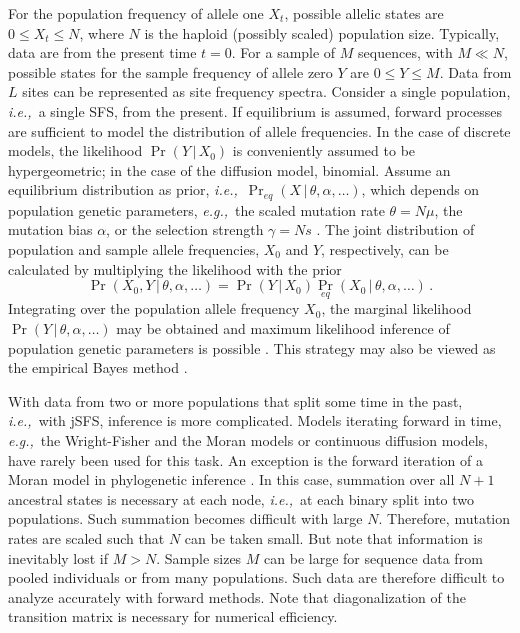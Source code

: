 \documentclass[preprint]{elsarticle}
\newcommand\given{{\,|\,}}
\newcommand\eg{{\it e.g.,}}
\newcommand\ie{{\it i.e.,}}
\begin{document}
For the population frequency of allele one $X_t$, possible allelic states are $0\leq X_t \leq N$, where $N$ is the haploid (possibly scaled) population size. Typically, data are from the present time $t=0$. For a sample of $M$ sequences, with $M\ll N$, possible states for the sample frequency of allele zero $Y$ are $0\leq Y \leq M$. Data from $L$ sites can be represented as site frequency spectra. Consider a single population, \ie\ a single SFS, from the present. If equilibrium is assumed, forward processes are sufficient to model the distribution of allele frequencies. In the case of discrete models, the likelihood $\Pr(Y\given X_0)$ is conveniently assumed to be hypergeometric; in the case of the diffusion model, binomial. Assume an equilibrium %
distribution as prior, \ie\ $\Pr_{eq}(X\given \theta,\alpha,\dots)$, which depends on population genetic parameters, \eg\ the scaled mutation rate $\theta=N\mu$, the mutation bias $\alpha$, or the selection strength $\gamma=Ns$ \citep[as defined in][]{Vogl15}. The joint distribution of population and sample allele frequencies, $X_0$ and $Y$, respectively, can be calculated by multiplying the likelihood with the prior
\begin{equation}
 \Pr(X_0,Y\given \theta,\alpha,\dots)=\Pr(Y\given X_0){\Pr}_{eq} (X_{0}\given \theta,\alpha,\dots)\,.
\end{equation}
Integrating over the population allele frequency $X_0$, the marginal likelihood $\Pr(Y\given \theta,\alpha,\dots)$ may be obtained and maximum likelihood inference of population genetic parameters is possible \citep{Vogl14b,Vogl15}. This strategy may also be viewed as the empirical Bayes method \citep[\eg][]{Carl00}.

With data from two or more populations that split some time in the past, \ie\ with jSFS, inference is more complicated. Models iterating forward in time, \eg\ the Wright-Fisher and the Moran models or continuous diffusion models, have rarely been used for this task. An exception is the forward iteration of a Moran model in phylogenetic inference \citep{Schrempf2016}. In this case, summation over all $N+1$ ancestral states is necessary at each node, \ie\ at each binary split into two populations. Such summation becomes difficult with large $N$. Therefore, mutation rates are scaled such that $N$ can be taken small.  But note that information is inevitably lost if $M>N$. Sample sizes $M$ can be large for sequence data from pooled individuals or from many populations. Such data are therefore difficult to analyze accurately with forward methods. Note that diagonalization of the transition matrix is necessary for numerical efficiency. 
\end{document}
